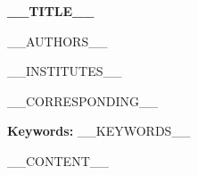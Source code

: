 \documentclass{default}
\begin{document}
\begin{center}
  {\LARGE\bfseries __TITLE__\par}
  \vspace{1em}
  {\normalsize __AUTHORS__\par}
  \vspace{0.5em}
  {\small __INSTITUTES__\par}
  \vspace{0.5em}
  __CORRESPONDING__
\end{center}
\vspace{1em}

\begin{abstract}
__ABSTRACT__
\end{abstract}

\noindent\textbf{Keywords:} __KEYWORDS__
\vspace{1em}

__CONTENT__
\end{document}
